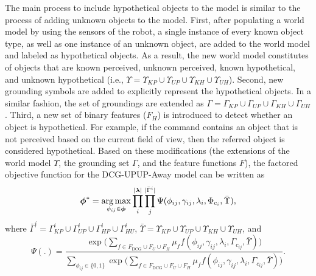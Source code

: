 The main process to include hypothetical objects to the model is similar to the process of adding unknown objects to the model. First, after populating a world model by using the sensors of the robot, a single instance of every known object type, as well as one instance of an unknown object, are added to the world model and labeled as hypothetical objects. As a result, the new world model constitutes of objects that are known perceived, unknown perceived, known hypothetical, and unknown hypothetical (i.e., $\Upsilon = \Upsilon_{KP} \cup \Upsilon_{UP} \cup \Upsilon_{KH} \cup \Upsilon_{UH}$). Second, new grounding symbols are added to explicitly represent the hypothetical objects. In a similar fashion, the set of groundings are extended as $\Gamma = \Gamma_{KP} \cup \Gamma_{UP} \cup \Gamma_{KH} \cup \Gamma_{UH}$. Third, a new set of binary features ($F_H$) is introduced to detect whether an object is hypothetical. For example, if the command contains an object that is not perceived based on the current field of view, then the referred object is considered hypothetical. Based on these modifications (the extensions of the world model $\Upsilon$, the grounding set $\Gamma$, and the feature functions $F$), the factored objective function for the DCG-UPUP-Away model can be written as
\begin{equation}
\boldsymbol{\phi}^* = \operatorname*{\arg\max}_{\phi_{ij} \in \boldsymbol{\phi}} \prod_{i}^{|\boldsymbol\lambda|} \prod_j^{|\bar\Gamma^i|} \Psi(\phi_{ij},\gamma_{ij},\lambda_i,\Phi_{c_{i}},\bar\Upsilon),
\label{eq:dcg_upup_away_llm1}
\end{equation}
where ${\bar{\Gamma}^i = \Gamma^i_{KP} \cup \Gamma^i_{UP} \cup \Gamma^i_{HP} \cup \Gamma^i_{HU}}$, $\bar\Upsilon = \Upsilon_{KP} \cup \Upsilon_{UP} \cup \Upsilon_{KH} \cup \Upsilon_{UH}$, and 
\begin{equation}
\Psi(.) = \frac{\exp \Big( \sum\limits_{f \in F_{\text{DCG}} \cup F_{U} \cup F_{H}} \mu_f f(\phi_{ij},\gamma_{ij},\lambda_i,\Gamma_{c_{ij}},\bar\Upsilon) \Big)}{\sum\limits_{\phi_{ij} \in \{0,1\}}\exp \Big( \sum\limits_{f \in F_{\text{DCG}} \cup F_{U} \cup F_{H}} \mu_f f(\phi_{ij},\gamma_{ij},\lambda_i,\Gamma_{c_{ij}},\bar\Upsilon) \Big)}.
\label{eq:dcg_upup_away_factor}
\end{equation}
